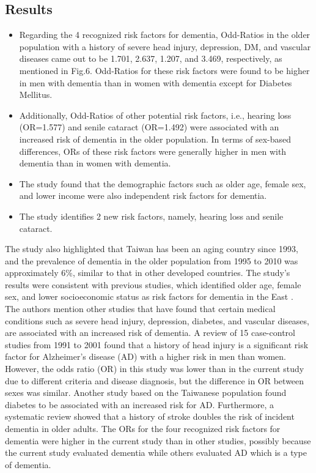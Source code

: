 \documentclass[12pt,letterpaper]{article}
\begin{document}
\subsection{Results}

\begin{itemize}
\item Regarding the 4 recognized risk factors for dementia, Odd-Ratios in the older population with a history of severe head injury, depression, DM, and vascular diseases came out to be 1.701, 2.637, 1.207, and 3.469, respectively, as mentioned in Fig.6. Odd-Ratios for these risk factors were found to be higher in men with dementia than in women with dementia except for Diabetes Mellitus. 

\item Additionally,  Odd-Ratios of other potential risk factors, i.e., hearing loss (OR=1.577) and senile cataract (OR=1.492) were associated with an increased risk of dementia in the older population. In terms of sex-based differences, ORs of these risk factors were generally higher in men with dementia than in women with dementia.

\item The study found that the demographic factors such as older age, female sex, and lower income were also independent risk factors for dementia.

\item  The study identifies 2 new risk factors, namely, hearing loss and senile cataract. 
\end{itemize}


The study also highlighted that Taiwan has been an aging country since 1993, and the prevalence of dementia in the older population from 1995 to 2010 was approximately 6\%, similar to that in other developed countries. The study's results were consistent with previous studies, which identified older age, female sex, and lower socioeconomic status as risk factors for dementia in the East  \cite{Kalaria}. \\

The authors mention other studies that have found that certain medical conditions such as severe head injury, depression, diabetes, and vascular diseases, are associated with an increased risk of dementia. A review of 15 case-control studies \cite{Reitz} from 1991 to 2001 found that a history of head injury is a significant risk factor for Alzheimer's disease (AD) with a higher risk in men than women. However, the odds ratio (OR) in this study was lower than in the current study due to different criteria and disease diagnosis, but the difference in OR between sexes was similar. Another study based on the Taiwanese population found diabetes to be associated with an increased risk for AD. Furthermore, a systematic review \cite{Sawa} showed that a history of stroke doubles the risk of incident dementia in older adults. The ORs for the four recognized risk factors for dementia were higher in the current study than in other studies, possibly because the current study evaluated dementia while others evaluated AD which is a type of dementia.  \\
\end{document}

